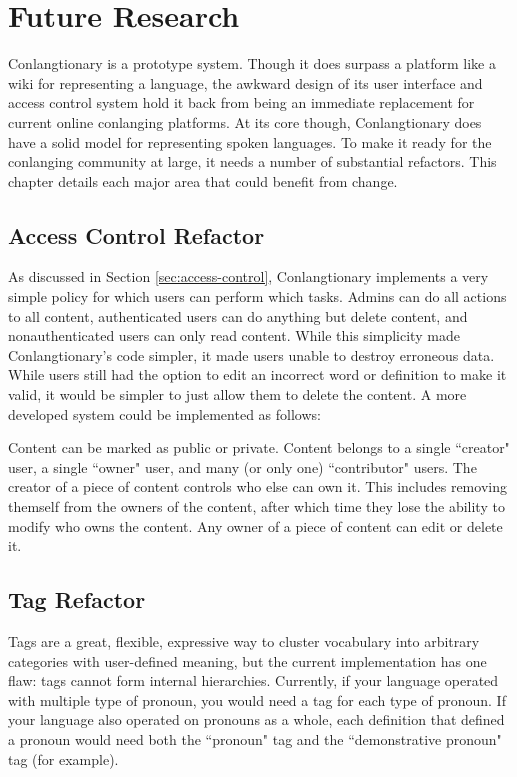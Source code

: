 \chapter{Future Research}
\label{chap:future}

Conlangtionary is a prototype system. Though it does surpass a platform like a wiki for representing a language, the awkward design of its user interface and access control system hold it back from being an immediate replacement for current online conlanging platforms. At its core though, Conlangtionary does have a solid model for representing spoken languages. To make it ready for the conlanging community at large, it needs a number of substantial refactors. This chapter details each major area that could benefit from change.

\section{Access Control Refactor}
\label{sec:refactor-access}

As discussed in Section \ref{sec:access-control}, Conlangtionary implements a very simple policy for which users can perform which tasks. Admins can do all actions to all content, authenticated users can do anything but delete content, and nonauthenticated users can only read content. While this simplicity made Conlangtionary's code simpler, it made users unable to destroy erroneous data. While users still had the option to edit an incorrect word or definition to make it valid, it would be simpler to just allow them to delete the content. A more developed system could be implemented as follows:

Content can be marked as public or private. Content belongs to a single ``creator" user, a single ``owner" user, and many (or only one) ``contributor" users. The creator of a piece of content controls who else can own it. This includes removing themself from the owners of the content, after which time they lose the ability to modify who owns the content. Any owner of a piece of content can edit or delete it.

\section{Tag Refactor}
\label{sec:refactor-tag}

Tags are a great, flexible, expressive way to cluster vocabulary into arbitrary categories with user-defined meaning, but the current implementation has one flaw: tags cannot form internal hierarchies. Currently, if your language operated with multiple type of pronoun, you would need a tag for each type of pronoun. If your language also operated on pronouns as a whole, each definition that defined a pronoun would need both the ``pronoun" tag and the ``demonstrative pronoun" tag (for example). 

